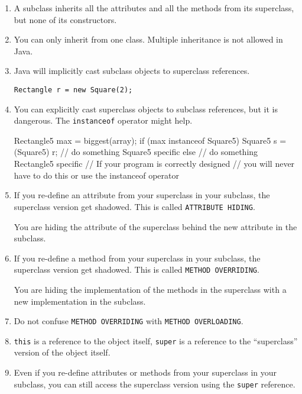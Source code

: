 \documentclass[a4paper, 9pt]{extarticle}
\begin{document}
\begin{enumerate}

  \item A subclass inherits all the attributes and all the methods from its
    superclass, but none of its constructors.

  \item You can only inherit from one class. Multiple inheritance is not
    allowed in Java.

  \item Java will implicitly cast subclass objects to superclass references.

    \verb+Rectangle r = new Square(2);+

  \item You can explicitly cast superclass objects to subclass references, but
    it is dangerous. The \verb+instanceof+ operator might help.

\begin{blackboard}
Rectangle5 max = biggest(array);
if (max instanceof Square5) {
  Square5 s = (Square5) r;
  // do something Square5 specific
} else {
  // do something Rectangle5 specific
}
// If your program is correctly designed
// you will never have to do this or use the instanceof operator
\end{blackboard}

  \item If you re-define an attribute from your superclass in your subclass,
    the superclass version get shadowed. This is called \verb+ATTRIBUTE HIDING+.

    You are hiding the attribute of the
    superclass behind the new attribute in the subclass.

  \item If you re-define a method from your superclass in your subclass, the
    superclass version get shadowed. This is called \verb+METHOD OVERRIDING+.

    You are hiding the implementation of the methods in the superclass with a
    new implementation in the subclass.

  \item Do not confuse \verb+METHOD OVERRIDING+ with \verb+METHOD OVERLOADING+.

  \item \verb+this+ is a reference to the object itself, \verb+super+ is a
    reference to the ``superclass'' version of the object itself.

  \item Even if you re-define attributes or methods from your superclass in
    your subclass, you can still access the superclass version using the
    \verb+super+ reference.


\end{enumerate}
\end{document}
